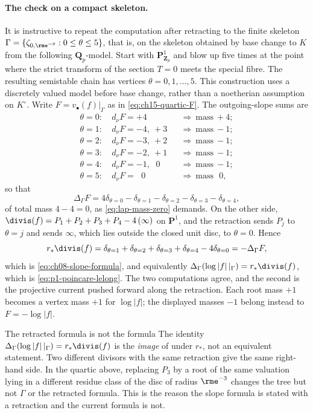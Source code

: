 \paragraph{The check on a compact skeleton.}
It is instructive to repeat the computation after retracting to the finite
skeleton $\Gamma=\{\zeta_{0,\rme^{-\theta}}:0\le\theta\le5\}$, that is, on
the skeleton obtained by base change to $K$ from the following
$\mathbf Q_p$-model.  Start with $\mathbf P^1_{\mathbf Z_p}$ and blow up
five times at the point where the strict transform of the section $T=0$
meets the special fibre.  The resulting semistable chain has vertices
$\theta=0,1,\ldots,5$.  This construction uses a discretely valued model
before base change, rather than a noetherian assumption on $K^\circ$.  Write
$F=v_\bullet(f)|_\Gamma$ as in \eqref{eq:ch15-quartic-F}.  The outgoing-slope
sums are
\begin{align*}
 \theta=0:&\ d_\nu F=+4 &&\Longrightarrow\ \text{mass}\ +4;\\
 \theta=1:&\ d_\nu F=-4,\ +3 &&\Longrightarrow\ \text{mass}\ -1;\\
 \theta=2:&\ d_\nu F=-3,\ +2 &&\Longrightarrow\ \text{mass}\ -1;\\
 \theta=3:&\ d_\nu F=-2,\ +1 &&\Longrightarrow\ \text{mass}\ -1;\\
 \theta=4:&\ d_\nu F=-1,\ \ \,0 &&\Longrightarrow\ \text{mass}\ -1;\\
 \theta=5:&\ d_\nu F=\ \ \,0 &&\Longrightarrow\ \text{mass}\ \ \ 0,
\end{align*}
so that
\[
 \Delta_\Gamma F
 =4\delta_{\theta=0}-\delta_{\theta=1}-\delta_{\theta=2}
   -\delta_{\theta=3}-\delta_{\theta=4},
\]
of total mass $4-4=0$, as \eqref{eq:lap-mass-zero} demands.  On the other
side, $\divis(f)=P_1+P_2+P_3+P_4-4\,(\infty)$ on $\mathbf P^1$, and the
retraction sends $P_j$ to $\theta=j$ and sends $\infty$, which lies outside
the closed unit disc, to $\theta=0$.  Hence
\[
 r_*\divis(f)
 =\delta_{\theta=1}+\delta_{\theta=2}+\delta_{\theta=3}+\delta_{\theta=4}
   -4\delta_{\theta=0}
 =-\Delta_\Gamma F ,
\]
which is \eqref{eq:ch08-slope-formula}, and equivalently
$\Delta_\Gamma(\log|f|\,|_\Gamma)=r_*\divis(f)$, which is
\eqref{eq:p1-poincare-lelong}.  The two computations agree, and the second is
the projective current pushed forward along the retraction.  Each root
mass $+1$ becomes a vertex mass $+1$ for $\log|f|$; the displayed masses
$-1$ belong instead to $F=-\log|f|$.

\begin{warning}{The retracted formula is not the formula}
The identity $\Delta_\Gamma(\log|f|\,|_\Gamma)=r_*\divis(f)$ is the
\emph{image} of  under $r_*$, not an equivalent
statement.  Two different divisors with the same retraction give the same
right-hand side.  In the quartic above, replacing $P_3$ by a root of the same
valuation lying in a different residue class of the disc of radius
$\rme^{-3}$ changes the tree but not $\Gamma$ or the retracted formula.  This
is the reason the slope formula  is stated with
a retraction and the current formula is not.
\end{warning}

